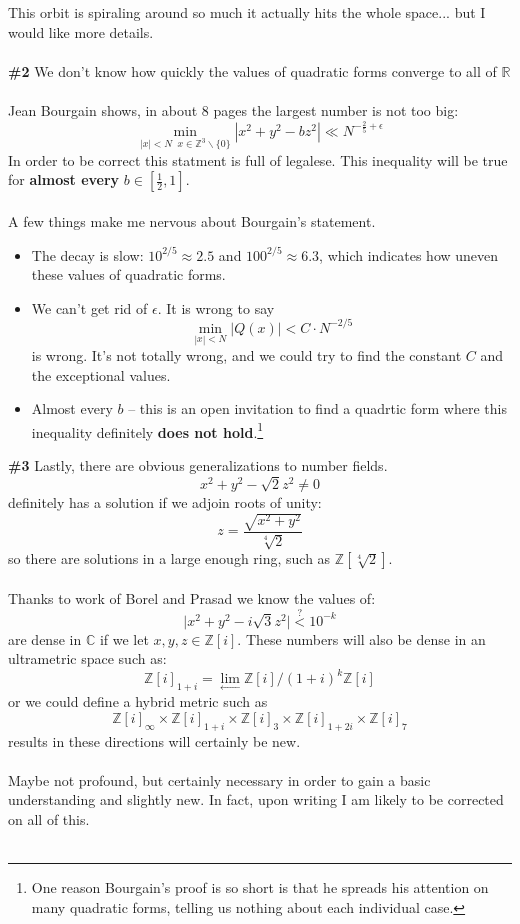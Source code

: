 \documentclass[12pt]{article}
\begin{document}
  This orbit is spiraling around so much it actually hits the whole space... but I would like more details.
 \\ \\
\textbf{\#2} We don't know how quickly the values of quadratic forms converge to all of $\mathbb{R}$ \\ \\
Jean Bourgain shows, in about 8 pages the largest number is not too big:
$$ \min_{|x| < N \; \; x \in \mathbb{Z}^3 \backslash \{ 0\} } | x^2 +  y^2 - b z^2  | \ll N^{-\frac{2}{5} + \epsilon}$$
In order to be correct this statment is full of legalese.  This inequality will be true for \textbf{almost every} $b \in [\frac{1}{2}, 1] $. \\ \\
A few things make me nervous about Bourgain's statement.  
\begin{itemize}
\item The decay is slow: $10^{2/5} \approx 2.5$ and $100^{2/5} \approx 6.3$, which indicates how uneven these values of quadratic forms.
\item We can't get rid of $\epsilon$.  It is wrong to say  $$\min_{|x| < N} |Q(x)| < C \cdot  N^{-2/5}$$ 
is wrong.  It's not totally wrong, and we could try to find the constant $C$ and the exceptional values.
\item Almost every $b$ -- this is an open invitation to find a quadrtic form where this inequality definitely \textbf{does not hold}.\footnote{ One reason Bourgain's proof is so short is that he spreads his attention on many quadratic forms, telling us nothing about each individual case. } 
\end{itemize}
\newpage
\noindent \textbf{\#3} Lastly, there are obvious generalizations to number fields.  
$$  x^2 + y^2  - \sqrt{2} z^2 \neq 0$$
definitely has a solution if we adjoin roots of unity:
$$ z =  \frac{ \sqrt{x^2 + y^2}}{\sqrt[4]{2}} $$
so there are solutions in a large enough ring, such as $\mathbb{Z}[\sqrt[4]{2}]$. \\ \\
Thanks to work of Borel and Prasad we know the  values of:
$$ \big| x^2 + y^2 - i \sqrt{3} z^2\big| \stackrel{?}{<} 10^{-k} $$
are dense in $\mathbb{C}$ if we let $x,y,z \in \mathbb{Z}[i]$.  These numbers will also be dense in an ultrametric space such as:
$$ \mathbb{Z}[i]_{1+i} = \lim_{\longleftarrow} \mathbb{Z}[i]/ (1+i)^k\mathbb{Z}[i]$$
or we could define a hybrid metric such as
$$ \mathbb{Z}[i]_\infty \times \mathbb{Z}[i]_{1+i} \times \mathbb{Z}[i]_3
\times \mathbb{Z}[i]_{1+2i} \times \mathbb{Z}[i]_7$$
results in these directions will certainly be new. \\ \\
Maybe not profound, but certainly necessary in order to gain a basic understanding and slightly new.  In fact, upon writing I am likely to be corrected on all of this.\\ \\
\end{document}
